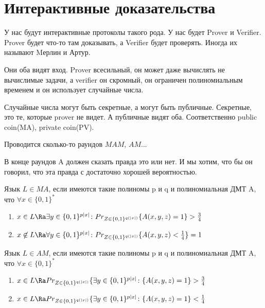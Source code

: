 \section{Интерактивные доказательства}
У нас будут интерактивные протоколы такого рода. У нас будет Prover и Verifier. 
Prover будет что-то там доказывать, а Verifier будет проверять. Иногда
их называют Mерлин и Артур. 

Они оба видят вход. Prover всесильный, он может даже вычислять не вычислимые задачи, а 
verifier он скромный, он ограничен полиномиальным временем и он использует случайные числа. 

Случайные числа могут быть секретные, а могут быть публичные. Секретные, это те, которые 
prover не видет. А публичные видят оба. Соответственно public coin(MA), private coin(PV).

Проводится сколько-то раундов $MAM$, $AM$... 

В конце раундов A должен сказать правда это или нет. И мы хотим, что бы 
он говорил, что эта правда с достаточно хорошей вероятностью. 

\begin{Def}
Язык $L \in MA$, если имеются такие полиномы p и q и 
полиномиальная ДМТ A, что $\forall x \in \{0, 1\}^*$\\
\begin{enumerate}
\item $x \in L \Ra \exists y \in \{0, 1\}^{p|x|} \colon Pr_{Z \in \{0, 1\}^{q(|x|)}} \{A(x, y, z) = 1\} > \frac{3}{4}$ \\
\item  $x \not \in L \Ra \forall y \in \{0, 1\}^{p|x|} \colon Pr_{Z \in \{0, 1\}^{q(|x|)}} \{A(x, y, z) < \frac{1}{4}\} = 1$ \\

\end{enumerate}

\end{Def}

\begin{Def}
Язык $L \in AM$, если имеются такие полиномы p и q и 
полиномиальная ДМТ A, что $\forall x \in \{0, 1\}^*$\\
\begin{enumerate}
\item $x \in L \Ra Pr_{Z \in \{0, 1\}^{q(|x|)}} \{\exists y \in \{0, 1\}^{p|x|} \colon  \{A(x, y, z) = 1\} > \frac{3}{4}$ \\
\item $x \in L \Ra Pr_{Z \in \{0, 1\}^{q(|x|)}} \{\exists y \in \{0, 1\}^{p|x|} \colon  \{A(x, y, z) = 1\} < \frac{1}{4}$ \\
\end{enumerate}

\end{Def}


